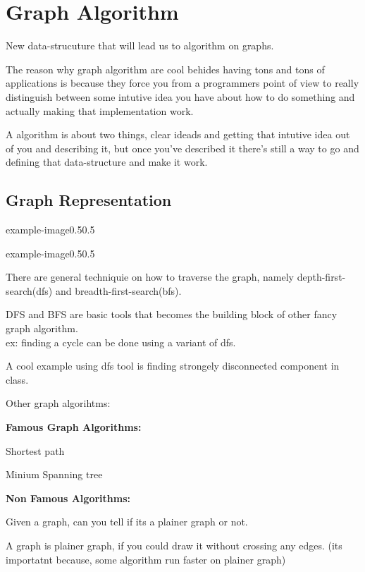 \chapter{Graph Algorithm}\label{ch:graph}

New data-strucuture that will lead us to algorithm on graphs.

The reason why graph algorithm are cool behides having tons and tons of applications is because they force you from a programmers point of view to really distinguish between some intutive idea you have about how to do something and actually making that implementation work.

A algorithm is about two things, clear ideads and getting that intutive idea out of you and describing it, but once you've described it there's  still a way to go and defining that data-structure and make it work.

\section{Graph Representation}

\begin{lfigure}{example-image}{0.5}{0.5}
    \lipsum[3]
\end{lfigure}

\begin{lfigure}
    {example-image}{0.5}{0.5}
    
\end{lfigure}

There are general techniquie on how to traverse the graph, namely depth-first-search(dfs) and breadth-first-search(bfs).

DFS and BFS are basic tools that becomes the building block of other fancy graph algorithm.\\
ex: finding  a cycle can be done using a variant of dfs.

A cool example using dfs tool is finding strongely disconnected component in class.

Other graph algorihtms:
\begin{exercise}
    \textbf{Famous Graph Algorithms:}
    \begin{compactenum}
        \item  Shortest path
        \item Minium Spanning tree
    \end{compactenum}

    \textbf{Non Famous Algorithms:}
    \begin{compactenum}
        \item Given a graph, can you tell if its a plainer graph or not.
        
        A graph is plainer graph, if you could draw it without crossing any edges. (its importatnt because, some algorithm run faster on plainer graph)
    \end{compactenum}
\end{exercise}

